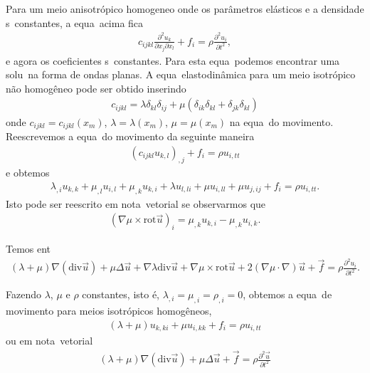 Para um meio anisotr\'opico homogeneo onde os par\^ametros el\'asticos e
a densidade s\ao\ constantes, a equa\cao\ acima fica
\begin{eqnarray}
c_{ijkl}\frac{\partial^2 u_k}{\partial x_j\partial x_l} + f_i = \rho\frac{\partial^2 u_i}{\partial t^2},
\end{eqnarray}
e agora os coeficientes s\ao\ constantes. Para esta equa\cao\ podemos
encontrar uma solu\cao\ na forma de ondas planas. A equa\cao\
elastodin\^amica para um meio isotr\'opico n\~ao homog\^eneo pode ser
obtido inserindo
\begin{eqnarray}
c_{ijkl} = \lambda\delta_{kl}\delta_{ij} + \mu(\delta_{ik}\delta_{kl} + \delta_{jk}\delta_{kl})
\end{eqnarray}
onde $c_{ijkl} = c_{ijkl}(x_m)$, $\lambda = \lambda(x_m)$, $\mu =
\mu(x_m)$ na equa\cao\ do movimento. Reescrevemos a equa\cao\ do
movimento da seguinte maneira
\begin{eqnarray}
(c_{ijkl}u_{k,l})_{,j} + f_i = \rho u_{i,tt}
\end{eqnarray}
e obtemos
\begin{eqnarray}
\lambda_{,i}u_{k,k} + \mu_{,l}u_{i,l} + \mu_{,k}u_{k,i} + \lambda u_{l,li} + \mu u_{i,ll} + \mu u_{j,ij} + f_i 
= \rho u_{i,tt}.
\label{eqelaiso}
\end{eqnarray}
Isto pode ser reescrito em nota\cao\ vetorial se observarmos que
\begin{eqnarray}
(\nabla\mu\times\mbox{rot}\vec{u})_i = \mu_{,k}u_{k,i} - \mu_{,k}u_{i,k}.
\end{eqnarray}

Temos ent\ao\
\begin{eqnarray}
(\lambda + \mu)\nabla(\mbox{div}\vec{u}) + \mu\Delta\vec{u} + \nabla\lambda\mbox{div}\vec{u} 
+ \nabla\mu\times\mbox{rot}\vec{u} + 2(\nabla\mu\cdot\nabla)\vec{u} + \vec{f} = \rho\frac{\partial^2 u_i}{\partial t^2}.
\end{eqnarray}

Fazendo $\lambda$, $\mu$ e $\rho$ constantes, isto \'e,
$\lambda_{,i}=\mu_{,i}=\rho_{,i}=0$, obtemos a equa\cao\ de movimento
para meios isotr\'opicos homog\^eneos,
\begin{eqnarray}
(\lambda + \mu)u_{k,ki} + \mu u_{i,kk} + f_i = \rho u_{i,tt}
\end{eqnarray}
ou em nota\cao\ vetorial
\begin{eqnarray}
(\lambda + \mu)\nabla(\mbox{div}\vec{u}) + \mu\Delta\vec{u} + \vec{f} = \rho\frac{\partial^2\vec{u}}{\partial t^2}
\end{eqnarray}


